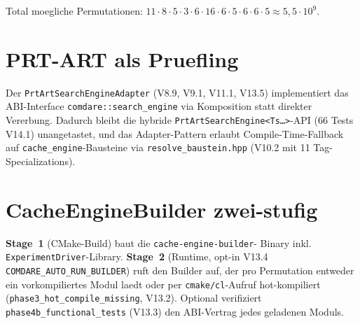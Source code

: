 Total moegliche Permutationen: $11 \cdot 8 \cdot 5 \cdot 3 \cdot 6 \cdot
16 \cdot 6 \cdot 5 \cdot 6 \cdot 6 \cdot 5 \approx 5{,}5 \cdot 10^9$.

\section{PRT-ART als Pruefling}

Der \texttt{PrtArtSearchEngineAdapter} (V8.9, V9.1, V11.1, V13.5)
implementiert das ABI-Interface \texttt{comdare::search\_engine} via
Komposition statt direkter Vererbung. Dadurch bleibt die hybride
\texttt{PrtArtSearchEngine<Ts\ldots>}-API (66 Tests V14.1) unangetastet,
und das Adapter-Pattern erlaubt Compile-Time-Fallback auf
\texttt{cache\_engine}-Bausteine via \texttt{resolve\_baustein.hpp}
(V10.2 mit 11 Tag-Specializations).

\section{CacheEngineBuilder zwei-stufig}

\textbf{Stage~1} (CMake-Build) baut die \texttt{cache-engine-builder}-
Binary inkl. \texttt{ExperimentDriver}-Library.
\textbf{Stage~2} (Runtime, opt-in V13.4 \texttt{COMDARE\_AUTO\_RUN\_BUILDER})
ruft den Builder auf, der pro Permutation entweder ein vorkompiliertes
Modul laedt oder per \texttt{cmake/cl}-Aufruf hot-kompiliert
(\texttt{phase3\_hot\_compile\_missing}, V13.2). Optional verifiziert
\texttt{phase4b\_functional\_tests} (V13.3) den ABI-Vertrag jedes
geladenen Moduls.
